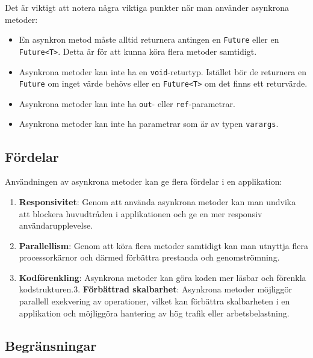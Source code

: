 Det är viktigt att notera några viktiga punkter när man använder
asynkrona metoder:

\begin{itemize}
\tightlist
\item
  En asynkron metod måste alltid returnera antingen en \texttt{Future}
  eller en \texttt{Future\textless{}T\textgreater{}}. Detta är för att
  kunna köra flera metoder samtidigt.
\item
  Asynkrona metoder kan inte ha en \texttt{void}-returtyp. Istället bör
  de returnera en \texttt{Future} om inget värde behövs eller en
  \texttt{Future\textless{}T\textgreater{}} om det finns ett returvärde.
\item
  Asynkrona metoder kan inte ha \texttt{out}- eller
  \texttt{ref}-parametrar.
\item
  Asynkrona metoder kan inte ha parametrar som är av typen
  \texttt{varargs}.
\end{itemize}

\hypertarget{fuxf6rdelar}{%
\subsection{Fördelar}\label{fuxf6rdelar}}

Användningen av asynkrona metoder kan ge flera fördelar i en
applikation:

\begin{enumerate}
\def\labelenumi{\arabic{enumi}.}
\tightlist
\item
  \textbf{Responsivitet}: Genom att använda asynkrona metoder kan man
  undvika att blockera huvudtråden i applikationen och ge en mer
  responsiv användarupplevelse.
\item
  \textbf{Parallellism}: Genom att köra flera metoder samtidigt kan man
  utnyttja flera processorkärnor och därmed förbättra prestanda och
  genomströmning.
\item
  \textbf{Kodförenkling}: Asynkrona metoder kan göra koden mer läsbar
  och förenkla kodstrukturen.3. \textbf{Förbättrad skalbarhet}:
  Asynkrona metoder möjliggör parallell exekvering av operationer,
  vilket kan förbättra skalbarheten i en applikation och möjliggöra
  hantering av hög trafik eller arbetsbelastning.
\end{enumerate}

\hypertarget{begruxe4nsningar}{%
\subsection{Begränsningar}\label{begruxe4nsningar}}

